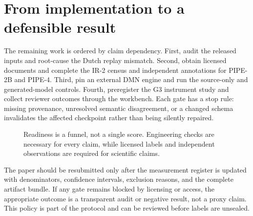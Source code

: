 \section{From implementation to a defensible result}

The remaining work is ordered by claim dependency. First, audit the released
inputs and root-cause the Dutch replay mismatch. Second, obtain licensed
documents and complete the IR-2 census and independent annotations for PIPE-2B
and PIPE-4. Third, pin an external DMN engine and run the source-only and
generated-model controls. Fourth, preregister the G3 instrument study and
collect reviewer outcomes through the workbench. Each gate has a stop rule:
missing provenance, unresolved semantic disagreement, or a changed schema
invalidates the affected checkpoint rather than being silently repaired.

\begin{figure}[t]
\centering

\caption{Readiness is a funnel, not a single score. Engineering checks are
necessary for every claim, while licensed labels and independent observations
are required for scientific claims.}
\label{fig:failure-funnel}
\end{figure}

The paper should be resubmitted only after the measurement register is updated
with denominators, confidence intervals, exclusion reasons, and the complete
artifact bundle. If any gate remains blocked by licensing or access, the
appropriate outcome is a transparent audit or negative result, not a proxy
claim. This policy is part of the protocol and can be reviewed before labels
are unsealed.
